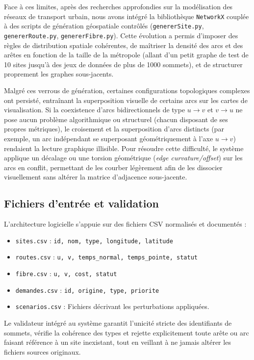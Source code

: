 Face à ces limites, après des recherches approfondies sur la modélisation des réseaux de transport urbain, nous avons intégré la bibliothèque \texttt{NetworkX} couplée à des scripts de génération géospatiale contrôlés (\texttt{genererSite.py}, \texttt{genererRoute.py}, \texttt{genererFibre.py}). Cette évolution a permis d'imposer des règles de distribution spatiale cohérentes, de maîtriser la densité des arcs et des arêtes en fonction de la taille de la métropole (allant d'un petit graphe de test de 10 sites jusqu'à des jeux de données de plus de 1000 sommets), et de structurer proprement les graphes sous-jacents. 

Malgré ces verrous de génération, certaines configurations topologiques complexes ont persisté, entraînant la superposition visuelle de certains arcs sur les cartes de visualisation. Si la coexistence d'arcs bidirectionnels de type $u \rightarrow v$ et $v \rightarrow u$ ne pose aucun problème algorithmique ou structurel (chacun disposant de ses propres métriques), le croisement et la superposition d'arcs distincts (par exemple, un arc indépendant se superposant géométriquement à l'axe $u \rightarrow v$) rendaient la lecture graphique illisible. Pour résoudre cette difficulté, le système applique un décalage ou une torsion géométrique (\emph{edge curvature/offset}) sur les arcs en conflit, permettant de les courber légèrement afin de les dissocier visuellement sans altérer la matrice d'adjacence sous-jacente.

\subsection{Fichiers d'entrée et validation}
L'architecture logicielle s'appuie sur des fichiers CSV normalisés et documentés :
\begin{itemize}
    \item \texttt{sites.csv} : \texttt{id, nom, type, longitude, latitude}
    \item \texttt{routes.csv} : \texttt{u, v, temps\_normal, temps\_pointe, statut}
    \item \texttt{fibre.csv} : \texttt{u, v, cost, statut}
    \item \texttt{demandes.csv} : \texttt{id, origine, type, priorite}
    \item \texttt{scenarios.csv} : Fichiers décrivant les perturbations appliquées.
\end{itemize}
Le validateur intégré au système garantit l'unicité stricte des identifiants de sommets, vérifie la cohérence des types et rejette explicitement toute arête ou arc faisant référence à un site inexistant, tout en veillant à ne jamais altérer les fichiers sources originaux.